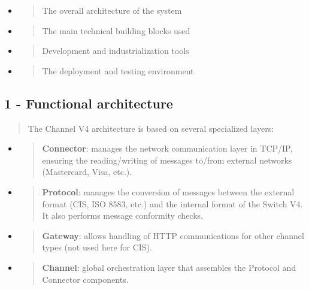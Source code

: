 \documentclass[12pt,a4paper]{report}
\begin{document}
\begin{itemize}
\item
  \begin{quote}
  The overall architecture of the system
  \end{quote}
\item
  \begin{quote}
  The main technical building blocks used
  \end{quote}
\item
  \begin{quote}
  Development and industrialization tools
  \end{quote}
\item
  \begin{quote}
  The deployment and testing environment
  \end{quote}
\end{itemize}


\subsection{1 - Functional architecture}

\begin{quote}
The Channel V4 architecture is based on several specialized layers:
\end{quote}

\begin{itemize}
\item
  \begin{quote}
  \textbf{Connector}: manages the network communication layer in TCP/IP,
  ensuring the reading/writing of messages to/from external networks
  (Mastercard, Visa, etc.).
  \end{quote}
\item
  \begin{quote}
  \textbf{Protocol}: manages the conversion of messages between the
  external format (CIS, ISO 8583, etc.) and the internal format of the
  Switch V4. It also performs message conformity checks.
  \end{quote}
\item
  \begin{quote}
  \textbf{Gateway}: allows handling of HTTP communications for other
  channel types (not used here for CIS).
  \end{quote}
\item
  \begin{quote}
  \textbf{Channel}: global orchestration layer that assembles the
  Protocol and Connector components.
  \end{quote}
\end{itemize}
\end{document}
